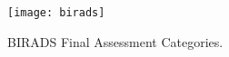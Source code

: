 
\begin{figure}[h]
\center
\texttt{[image: birads]}
\caption{BIRADS Final Assessment Categories.}
\label{fig:birads}
\end{figure}